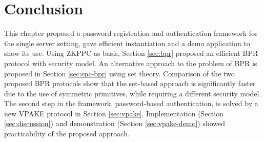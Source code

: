 


\section{Conclusion} \label{sec:vpake-conclusion}
This chapter proposed a password registration and authentication framework for the single server setting, gave efficient instantiation and a demo application to show its use.
Using \ac{ZKPPC} as basis, Section \ref{sec:bpr} proposed an efficient \acl{BPR} protocol with security model.
An alternative approach to the problem of \ac{BPR} is proposed in Section \ref{sec:spc-bpr} using set theory.
Comparison of the two proposed \ac{BPR} protocols show that the set-based approach is significantly faster due to the use of symmetric primitives, while requiring a different security model.
The second step in the framework, password-based authentication, is solved by a new \ac{VPAKE} protocol in Section \ref{sec:vpake}.
Implementation (Section \ref{sec:discussion}) and demonstration (Section \ref{sec:vpake-demo}) showed practicability of the proposed approach.


